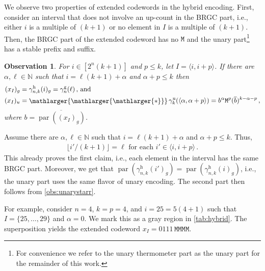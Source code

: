 \documentclass[9pt,journal,compsoc]{IEEEtran}
\newtheorem{observation}[theorem]{Observation}
\theoremstyle{remark}
\DeclareMathOperator{\parity}{par}
\newcommand{\bigstarr}{\mathop{\raisebox{-.7pt}{\ensuremath{\mathlarger{\mathlarger{\mathlarger{*}}}}}}}
\newcommand{\mfu}{\mathtt{M}}
\newcommand{\IN}{\mathbb{N}}
\newcommand{\floor}[1]{\lfloor{#1}\rfloor}
\newcommand{\ang}[1]{\langle{#1}\rangle}
\newcommand{\intvl}[1]{\ang{#1}}
\newcommand{\gBRGC}[1]{\gamma_{#1}^{\operatorname{g}}}
\newcommand{\gUnary}[1]{\gamma_{#1}^{\operatorname{u}}}
\newcommand{\gHyb}[1]{\gamma_{#1}^{\operatorname{h}}}
\begin{document}
We observe two properties of extended codewords in the hybrid encoding.
First, consider an interval that does not involve an up-count in the BRGC part, i.e.,
  either $i$ is a multiple of $(k+1)$ or no element in $I$ is a multiple
  of $(k+1)$.
Then, the BRGC part of the extended codeword has no $\mfu$ and the
  unary part\footnote{For convenience we refer to the unary thermometer part as the unary part for the remainder of this work.}
  has a stable prefix and suffix.

\begin{observation}\label{obs:samecolumn}
  For $i\in [2^{n}(k+1)]$ and $p\leq k$, let $I=\intvl{i,i+p}$.
  If there are $\alpha,\ell\in\IN$ such that $i=\ell(k+1)+\alpha$
  and $\alpha + p\leq k$ then
  \begin{align*}
    (x_I)_g &= \gHyb{n,k}(i)_g = \gBRGC{n}(\ell) \,\text{, and}\\
    (x_I)_u &= \bigstarr\gUnary{k}(\intvl{\alpha,\alpha+p}) = b^\alpha \mfu^p (\overline{b})^{k-\alpha-p}\,,
  \end{align*}
  where $b=\overline{\parity((x_I)_g)}$.
\end{observation}
\begin{IEEEproof}
  Assume there are $\alpha,\ell\in\IN$ such that $i=\ell(k+1)+\alpha$
  and $\alpha + p\leq k$. Thus,
  \begin{align*}
    \floor{i'/(k+1)}=\ell \text{ for each } i'\in\intvl{i,i+p}\,.
  \end{align*}
  This already proves the first claim, i.e., each element in the interval has the same BRGC part.
  Moreover, we get that
  $\parity(\gHyb{n,k}(i')_g)=\parity(\gHyb{n,k}(i)_g)$, i.e., the unary part uses
  the same flavor of unary encoding.
  The second part then follows from \cref{obs:unarystarr}.
\end{IEEEproof}

For example, consider $n=4$, $k=p=4$, and $i=25=5(4+1)$ such that
  $I=\{25,\ldots, 29\}$ and $\alpha=0$.
We mark this as a gray region in \cref{tab:hybrid}.
The superposition yields the extended codeword $x_I=0111\,\mfu\mfu\mfu\mfu$.
\end{document}
